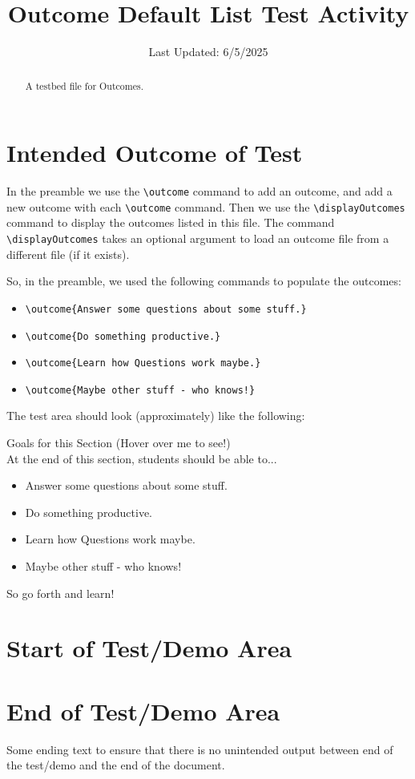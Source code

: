 \documentclass{ximera}
\title{Outcome Default List Test Activity}
\date{Last Updated: 6/5/2025}
\begin{document}
\begin{abstract}
    A testbed file for Outcomes.
\end{abstract}
\maketitle

\section{Intended Outcome of Test}

In the preamble we use the \verb|\outcome| command to add an outcome, and add a new outcome with each \verb|\outcome| command. 
Then we use the \verb|\displayOutcomes| command to display the outcomes listed in this file.
The command \verb|\displayOutcomes| takes an optional argument to load an outcome file from a different file (if it exists).

So, in the preamble, we used the following commands to populate the outcomes:
\begin{itemize}
    \item \verb|\outcome{Answer some questions about some stuff.} |
    \item \verb|\outcome{Do something productive.} |
    \item \verb|\outcome{Learn how Questions work maybe.} |
    \item \verb|\outcome{Maybe other stuff - who knows!} |
\end{itemize}


The test area should look (approximately) like the following:


Goals for this Section (Hover over me to see!)\\
At the end of this section, students should be able to...
\begin{itemize}
\item Answer some questions about some stuff.
\item Do something productive.
\item Learn how Questions work maybe.
\item Maybe other stuff - who knows!
\end{itemize}
So go forth and learn!



\section{Start of Test/Demo Area}

\displayOutcomes

\section{End of Test/Demo Area}

Some ending text to ensure that there is no unintended output between end of the test/demo and the end of the document.
\end{document}
